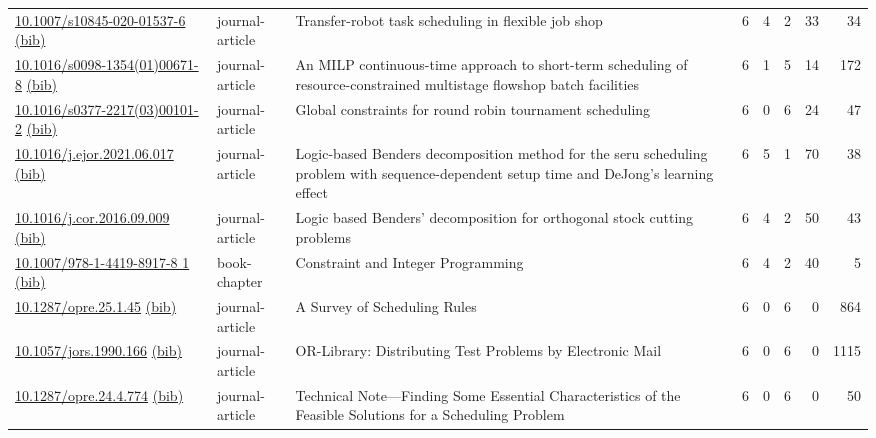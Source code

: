{\begin{longtable}{p{5cm}lp{11cm}rrrrr}
\href{http://dx.doi.org/10.1007/s10845-020-01537-6}{10.1007/s10845-020-01537-6} \href{https://www.doi2bib.org/bib/10.1007/s10845-020-01537-6}{(bib)} & journal-article & Transfer-robot task scheduling in flexible job shop & 6 & 4 & 2 & 33 & 34 \\
\href{http://dx.doi.org/10.1016/s0098-1354(01)00671-8}{10.1016/s0098-1354(01)00671-8} \href{https://www.doi2bib.org/bib/10.1016/s0098-1354(01)00671-8}{(bib)} & journal-article & An MILP continuous-time approach to short-term scheduling of resource-constrained multistage flowshop batch facilities & 6 & 1 & 5 & 14 & 172 \\
\href{http://dx.doi.org/10.1016/s0377-2217(03)00101-2}{10.1016/s0377-2217(03)00101-2} \href{https://www.doi2bib.org/bib/10.1016/s0377-2217(03)00101-2}{(bib)} & journal-article & Global constraints for round robin tournament scheduling & 6 & 0 & 6 & 24 & 47 \\
\href{http://dx.doi.org/10.1016/j.ejor.2021.06.017}{10.1016/j.ejor.2021.06.017} \href{https://www.doi2bib.org/bib/10.1016/j.ejor.2021.06.017}{(bib)} & journal-article & Logic-based Benders decomposition method for the seru scheduling problem with sequence-dependent setup time and DeJong's learning effect & 6 & 5 & 1 & 70 & 38 \\
\href{http://dx.doi.org/10.1016/j.cor.2016.09.009}{10.1016/j.cor.2016.09.009} \href{https://www.doi2bib.org/bib/10.1016/j.cor.2016.09.009}{(bib)} & journal-article & Logic based Benders' decomposition for orthogonal stock cutting problems & 6 & 4 & 2 & 50 & 43 \\
\href{http://dx.doi.org/10.1007/978-1-4419-8917-8_1}{10.1007/978-1-4419-8917-8 1} \href{https://www.doi2bib.org/bib/10.1007/978-1-4419-8917-8_1}{(bib)} & book-chapter & Constraint and Integer Programming & 6 & 4 & 2 & 40 & 5 \\
\href{http://dx.doi.org/10.1287/opre.25.1.45}{10.1287/opre.25.1.45} \href{https://www.doi2bib.org/bib/10.1287/opre.25.1.45}{(bib)} & journal-article & A Survey of Scheduling Rules & 6 & 0 & 6 & 0 & 864 \\
\href{http://dx.doi.org/10.1057/jors.1990.166}{10.1057/jors.1990.166} \href{https://www.doi2bib.org/bib/10.1057/jors.1990.166}{(bib)} & journal-article & OR-Library: Distributing Test Problems by Electronic Mail & 6 & 0 & 6 & 0 & 1115 \\
\href{http://dx.doi.org/10.1287/opre.24.4.774}{10.1287/opre.24.4.774} \href{https://www.doi2bib.org/bib/10.1287/opre.24.4.774}{(bib)} & journal-article & Technical Note—Finding Some Essential Characteristics of the Feasible Solutions for a Scheduling Problem & 6 & 0 & 6 & 0 & 50 \\

\end{longtable}}
